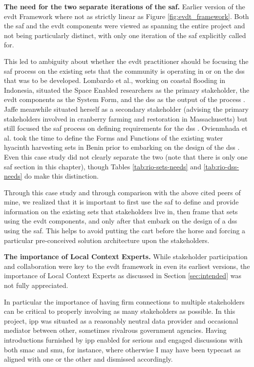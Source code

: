 \textbf{The need for the two separate iterations of the \ac{saf}.} Earlier version of the \ac{evdt} Framework where not as strictly linear as Figure \ref{fig:evdt_framework}. Both the \ac{saf} and the \ac{evdt} components were viewed as spanning the entire project and not being particularly distinct, with only one iteration of the \ac{saf} explicitly called for. 

This led to ambiguity about whether the \ac{evdt} practitioner should be focusing the \ac{saf} process on the existing \ac{sets} that the community is operating in or on the \ac{dss} that was to be developed. Lombardo et al., working on coastal flooding in Indonesia, situated the Space Enabled researchers as the primary stakeholder, the \ac{evdt} components as the System Form, and the \ac{dss} as the output of the process \cite{lombardoEnvironmentVulnerabilityDecisionTechnologyFrameworkDecision2022}.   Jaffe meanwhile situated herself as a secondary stakeholder (advising the primary stakeholders involved in cranberry farming and restoration in Massachusetts) but still focused the \ac{saf} process on defining requirements for the \ac{dss} \cite{jaffeEnvironmentalEconomicSystems2022}. Ovienmhada et al. took the time to define the Forms and Functions of the existing water hyacinth harvesting \ac{sets} in Benin prior to embarking on the design of the \ac{dss} \cite{ovienmhadaInclusiveDesignEarth2021}. Even this case study did not clearly separate the two (note that there is only one \ac{saf} section in this chapter), though Tables \ref{tab:rio-sets-needs} and \ref{tab:rio-dss-needs} do make this distinction. 

Through this case study and through comparison with the above cited peers of mine, we realized that it is important to first use the \ac{saf} to define and provide information on the existing \ac{sets} that stakeholders live in, then frame that \ac{sets} using the \ac{evdt} components, and only after that embark on the design of a \ac{dss} using the \ac{saf}. This helps to avoid putting the cart before the horse and forcing a particular pre-conceived solution architecture upon the stakeholders. 

\textbf{The importance of Local Context Experts.} While stakeholder participation and collaboration were key to the \ac{evdt} framework in even its earliest versions, the importance of Local Context Experts as discussed in Section \ref{sec:intended} was not fully appreciated. 

In particular the importance of having firm connections to multiple stakeholders can be critical to properly involving as many stakeholders as possible. In this project, \ac{ipp} was situated as a reasonably neutral data provider and occasional mediator between other, sometimes rivalrous government agencies. Having introductions furnished by \ac{ipp} enabled for serious and engaged discussions with both \ac{smac} and \ac{smu}, for instance, where otherwise I may have been typecast as aligned with one or the other and dismissed accordingly.  

